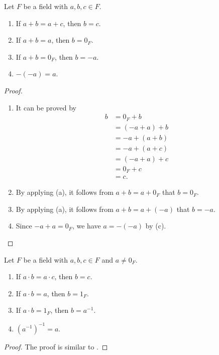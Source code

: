 \begin{proposition}\label{prop:cancelltaion-of-addition}
  Let $F$ be a field with $a, b, c \in F$.
  \begin{enumerate}
    \item If $a + b = a + c$, then $b = c$.
    \item If $a + b = a$, then $b = 0_F$.
    \item If $a + b = 0_F$, then $b = -a$.
    \item $-(-a) = a$.
  \end{enumerate}
\end{proposition}
\begin{proof} \leavevmode
  \begin{enumerate}
    \item It can be proved by
      \begin{align*}
        b
        &= 0_F + b      \\
        &= (-a + a) + b \\
        &= -a + (a + b) \\
        &= -a + (a + c) \\
        &= (-a + a) + c \\
        &= 0_F + c      \\
        &= c.
      \end{align*}
    \item By applying (a), it follows from $a + b = a + 0_F$ that $b = 0_F$.
    \item By applying (a), it follows from $a + b = a + (-a)$ that $b = -a$.
    \item Since $-a + a = 0_F$, we have $a = -(-a)$ by (c). \qedhere
  \end{enumerate}
\end{proof}

\begin{proposition}\label{prop:cancelltaion-of-multiplication}
  Let $F$ be a field with $a, b, c \in F$ and $a \neq 0_F$.
  \begin{enumerate}
    \item If $a \cdot b = a \cdot c$, then $b = c$.
    \item If $a \cdot b = a$, then $b = 1_F$.
    \item If $a \cdot b = 1_F$, then $b = a^{-1}$.
    \item $(a^{-1})^{-1} = a$.
  \end{enumerate}
\end{proposition}
\begin{proof}
  The proof is similar to .
\end{proof}

